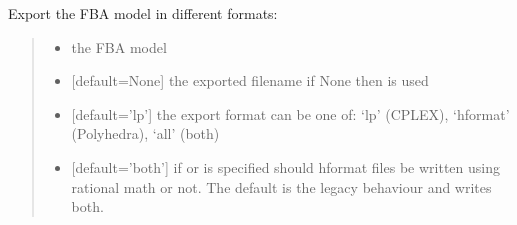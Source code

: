 \documentclass[letterpaper,12pt,english]{sphinxmanual}
\begin{document}
\begin{fulllineitems}

\pysigstartsignatures
\pysiglinewithargsret
{}
{\sphinxparamcomma {}\sphinxparamcomma {}\sphinxparamcomma {}\sphinxparamcomma {}}
{}
\pysigstopsignatures
\sphinxAtStartPar
Export the FBA model in different formats:
\begin{quote}\begin{description}
\begin{itemize}
\item {} 
\sphinxAtStartPar
{} \textendash{} the FBA model

\item {} 
\sphinxAtStartPar
{} \textendash{} {[}default=None{]} the exported filename if None then  is used

\item {} 
\sphinxAtStartPar
{} \textendash{} {[}default=’lp’{]} the export format can be one of: ‘lp’ (CPLEX), ‘hformat’ (Polyhedra), ‘all’ (both)

\item {} 
\sphinxAtStartPar
{} \textendash{} {[}default=’both’{]} if  or  is specified should hformat files be written using rational math or not. The default  is the legacy behaviour and writes both.

\end{itemize}

\end{description}\end{quote}

\end{fulllineitems}
\end{document}
